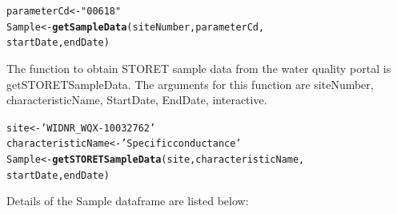\documentclass[a4paper,11pt]{article}\usepackage[]{graphicx}\usepackage[]{color}
\makeatletter
\newcommand{\hlstr}[1]{\textcolor[rgb]{0.192,0.494,0.8}{#1}}%
\newcommand{\hlstd}[1]{\textcolor[rgb]{0.345,0.345,0.345}{#1}}%
\newcommand{\hlkwb}[1]{\textcolor[rgb]{0.69,0.353,0.396}{#1}}%
\newcommand{\hlkwd}[1]{\textcolor[rgb]{0.737,0.353,0.396}{\textbf{#1}}}%
\newenvironment{kframe}{%
 \def\at@end@of@kframe{}%
 \ifinner\ifhmode%
  \def\at@end@of@kframe{\end{minipage}}%
  \begin{minipage}{\columnwidth}%
 \fi\fi%
 \def\FrameCommand##1{\hskip\@totalleftmargin \hskip-\fboxsep
 \colorbox{shadecolor}{##1}\hskip-\fboxsep
     \hskip-\linewidth \hskip-\@totalleftmargin \hskip\columnwidth}%
 \MakeFramed {\advance\hsize-\width
   \@totalleftmargin\z@ \linewidth\hsize
   \@setminipage}}%
 {\par\unskip\endMakeFramed%
 \at@end@of@kframe}
\newenvironment{knitrout}{}{} %
\makeatother
\begin{document}
\begin{knitrout}
\color{fgcolor}\begin{kframe}
\begin{alltt}
\hlstd{parameterCd} \hlkwb{<-} \hlstr{"00618"}
\hlstd{Sample} \hlkwb{<-}\hlkwd{getSampleData}\hlstd{(siteNumber,parameterCd,}
      \hlstd{startDate, endDate)}
\end{alltt}
\end{kframe}
\end{knitrout}


The function to obtain STORET sample data from the water quality portal is getSTORETSampleData. The arguments for this function are siteNumber, characteristicName, StartDate, EndDate, interactive. 

\begin{knitrout}
\color{fgcolor}\begin{kframe}
\begin{alltt}
\hlstd{site} \hlkwb{<-} \hlstr{'WIDNR_WQX-10032762'}
\hlstd{characteristicName} \hlkwb{<-} \hlstr{'Specific conductance'}
\hlstd{Sample} \hlkwb{<-}\hlkwd{getSTORETSampleData}\hlstd{(site,characteristicName,}
      \hlstd{startDate, endDate)}
\end{alltt}
\end{kframe}
\end{knitrout}



\pagebreak

Details of the Sample dataframe are listed below:
\end{document}
